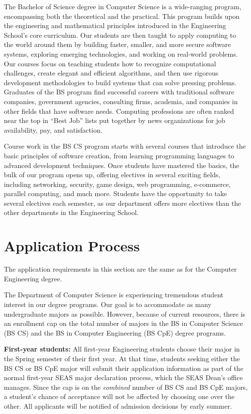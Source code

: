 \documentclass[10pt,letter,twocolumn]{book}
\newcommand{\mysection}[1]{\section{#1}\renewcommand{\rightmark}{#1}}
\begin{document}
The Bachelor of Science degree in Computer Science is a wide-ranging
program, encompassing both the theoretical and the practical.  This
program builds upon the engineering and mathematical principles
introduced in the Engineering School's core curriculum.  Our students
are then taught to apply computing to the world around them by building
faster, smaller, and more secure software systems, exploring emerging
technologies, and working on real-world problems.  Our courses focus
on teaching students how to recognize computational challenges, create
elegant and efficient algorithms, and then use rigorous development
methodologies to build systems that can solve pressing
problems. Graduates of the BS program find successful careers with
traditional software companies, government agencies, consulting firms,
academia, and companies in other fields that have software needs.
Computing professions are often ranked near the top in ``Best Job''
lists put together by news organizations for job availability, pay,
and satisfaction.

Course work in the BS CS program starts with several courses that
introduce the basic principles of software creation, from learning
programming languages to advanced development techniques.  Once
students have mastered the basics, the bulk of our program opens up,
offering electives in several exciting fields, including networking,
security, game design, web programming, e-commerce, parallel
computing, and much more.  Students have the opportunity to take
several electives each semester, as our department offers more
electives than the other departments in the Engineering School. 

\mysection{Application Process}
\label{bscsapplicationprocess}

The application requirements in this section are the same as for the
Computer Engineering degree.

The Department of Computer Science is experiencing tremendous student
interest in our degree programs. Our goal is to accommodate as many
undergraduate majors as possible. However, because of current
resources, there is an enrollment cap on the total number of
majors in the BS in Computer Science (BS CS) and the BS in Computer
Engineering (BS CpE) degree programs.

{\bf First-year students:} All first-year Engineering students choose
their major in the Spring semester of their first year. At that time,
students seeking either the BS CS or BS CpE major will submit their
application information as part of the normal first-year SEAS major
declaration process, which the SEAS Dean's office manages. Since the
cap is on the {\em combined} number of BS CS and BS CpE majors, a
student's chance of acceptance will not be affected by choosing one
over the other. All applicants will be notified of admission decisions
by early summer.
\end{document}
